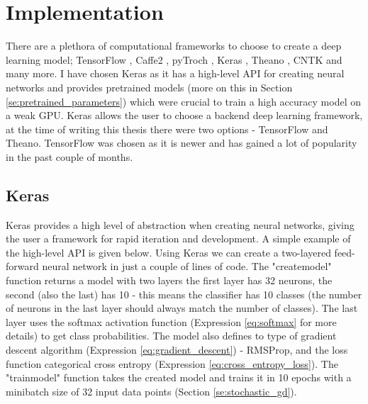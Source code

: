 \documentclass[times, utf8, diplomski]{fer}
\begin{document}
\section{Implementation}

There are a plethora of computational frameworks to choose to create a deep learning model; TensorFlow \citep{tensorflow}, Caffe2 \citep{caffe}, pyTroch \citep{pytorch}, Keras \citep{keras}, Theano \citep{theano}, CNTK \citep{cntk} and many more. I have chosen Keras as it has a high-level API for creating neural networks and provides pretrained models (more on this in Section \ref{se:pretrained_parameters}) which were crucial to train a high accuracy model on a weak GPU. Keras allows the user to choose a backend deep learning framework, at the time of writing this thesis there were two options - TensorFlow and Theano. TensorFlow was chosen as it is newer and has gained a lot of popularity in the past couple of months.

\subsection{Keras}
\label{se:keras}

Keras provides a high level of abstraction when creating neural networks, giving the user a framework for rapid iteration and development. A simple example of the high-level API is given below. Using Keras we can create a two-layered feed-forward neural network in just a couple of lines of code. The "create\textunderscore model" function returns a model with two layers the first layer has 32 neurons, the second (also the last) has 10 - this means the classifier has 10 classes (the number of neurons in the last layer should always match the number of classes). The last layer uses the softmax activation function (Expression \ref{eq:softmax} for more details) to get class probabilities. The model also defines to type of gradient descent algorithm (Expression \ref{eq:gradient_descent}) - RMSProp, and the loss function categorical cross entropy (Expression \ref{eq:cross_entropy_loss}). The "train\textunderscore model" function takes the created model and trains it in 10 epochs with a minibatch size of 32 input data points (Section \ref{se:stochastic_gd}).
\end{document}
